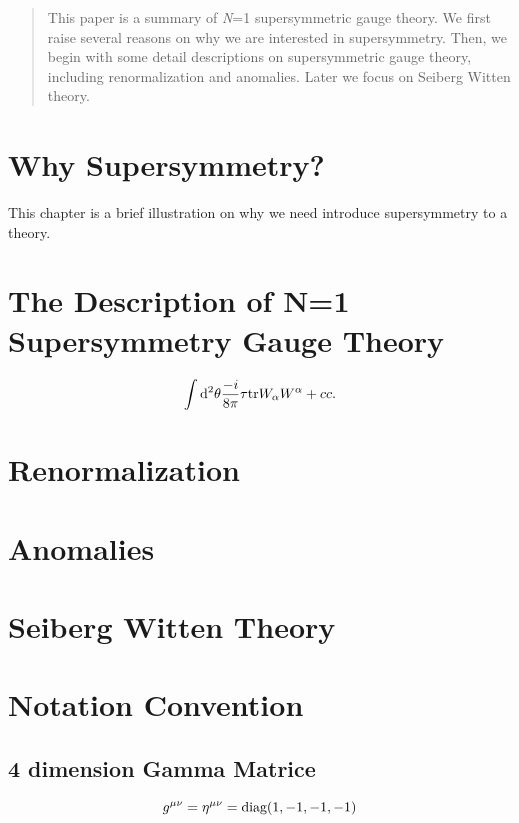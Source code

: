 \documentclass[type = bachelor]{fduthesis-en}
\begin{document}
  \tableofcontents
  \begin{abstract}
	  This paper is a summary of \textit{N}=1 supersymmetric 
	  gauge theory. We first raise several reasons on why we 
	  are interested in supersymmetry. Then, we begin with 
	  some detail descriptions on supersymmetric gauge theory, 
	  including renormalization and anomalies. Later we focus 
	  on Seiberg Witten theory. 
   \end{abstract}
   
\chapter{Why Supersymmetry?}
	  This chapter is a brief illustration on why we need introduce 
	  supersymmetry to a theory. 
	
\chapter{The Description of N=1 Supersymmetry Gauge Theory}\cite{ryder1996quantum}

    \begin{align}
    	\int \dd^2{\theta}\frac{-i}{8\pi}\tau \text{tr} W_{\alpha}W^{\alpha}+ cc.
    \end{align}

\chapter{Renormalization}

\chapter{Anomalies}

\chapter{Seiberg Witten Theory}

\appendix

\chapter{Notation Convention}

  \section{4 dimension Gamma Matrice}
    \begin{equation}
       g^{\mu\nu} = \eta^{\mu\nu} = \text{diag}(1,-1,-1,-1)
    \end{equation}
    
\printbibliography
\end{document}

